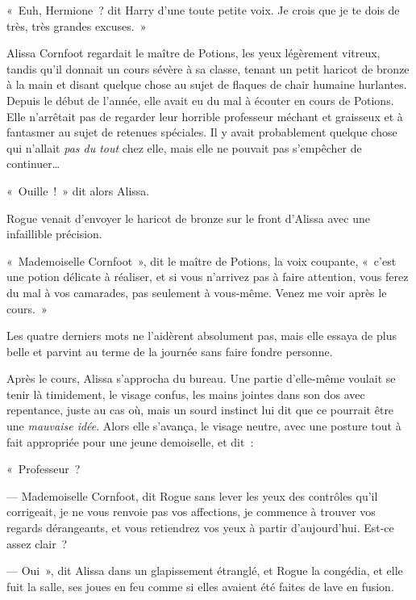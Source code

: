
«~Euh, Hermione~? dit Harry d'une toute petite voix.
Je crois que je te dois de très, très grandes excuses.~»


Alissa Cornfoot regardait le maître de Potions, les yeux légèrement vitreux, tandis qu'il donnait un cours sévère à sa classe, tenant un petit haricot de bronze à la main et disant quelque chose au sujet de flaques de chair humaine hurlantes.
Depuis le début de l'année, elle avait eu du mal à écouter en cours de Potions.
Elle n'arrêtait pas de regarder leur horrible professeur méchant et graisseux et à fantasmer au sujet de retenues spéciales.
Il y avait probablement quelque chose qui n'allait \emph{pas du tout} chez elle, mais elle ne pouvait pas s'empêcher de continuer…

«~Ouille~!~»
dit alors Alissa.

Rogue venait d'envoyer le haricot de bronze sur le front d'Alissa avec une infaillible précision.

«~Mademoiselle Cornfoot~», dit le maître de Potions, la voix coupante, «~c'est une potion délicate à réaliser, et si vous n'arrivez pas à faire attention, vous ferez du mal à vos camarades, pas seulement à vous-même.
Venez me voir après le cours.~»

Les quatre derniers mots ne l'aidèrent absolument pas, mais elle essaya de plus belle et parvint au terme de la journée sans faire fondre personne.

Après le cours, Alissa s'approcha du bureau.
Une partie d'elle-même voulait se tenir là timidement, le visage confus, les mains jointes dans son dos avec repentance, juste au cas où, mais un sourd instinct lui dit que ce pourrait être une \emph{mauvaise idée}.
Alors elle s'avança, le visage neutre, avec une posture tout à fait appropriée pour une jeune demoiselle, et dit~:

«~Professeur~?

--- Mademoiselle Cornfoot, dit Rogue sans lever les yeux des contrôles qu'il corrigeait, je ne vous renvoie pas vos affections, je commence à trouver vos regards dérangeants, et vous retiendrez vos yeux à partir d'aujourd'hui.
Est-ce assez clair~?

--- Oui~», dit Alissa dans un glapissement étranglé, et Rogue la congédia, et elle fuit la salle, ses joues en feu comme si elles avaient été faites de lave en fusion.

